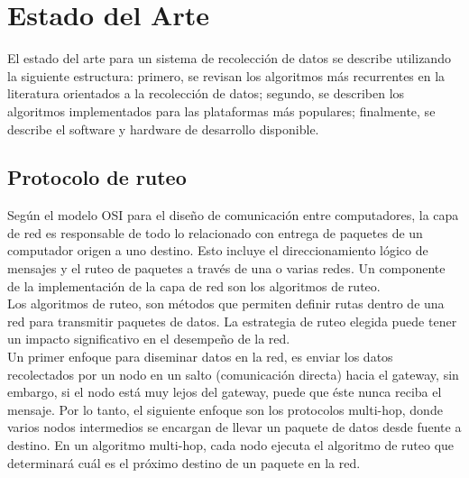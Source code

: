 \section{Estado del Arte}
El estado del arte para un sistema de recolección de datos se describe utilizando la siguiente estructura: primero, se revisan los algoritmos más recurrentes en la literatura orientados a la recolección de datos; segundo, se describen los algoritmos implementados para las plataformas más populares; finalmente, se describe el software y hardware de desarrollo disponible.

\subsection{Protocolo de ruteo}
Según el modelo OSI para el diseño de comunicación entre computadores, la capa de red es responsable de todo lo relacionado con entrega de paquetes de un computador origen a uno destino. Esto incluye el direccionamiento lógico de mensajes y el ruteo de paquetes a través de una o varias redes. Un componente de la implementación de la capa de red son los algoritmos de ruteo. \\


Los algoritmos de ruteo, son métodos que permiten definir rutas dentro de una red para transmitir paquetes de datos. La estrategia de ruteo elegida puede tener un impacto significativo en el desempeño de la red\cite{WSNSurvey}.\\


Un primer enfoque para diseminar datos en la red, es enviar los datos recolectados por un nodo en un salto (comunicación directa) hacia el gateway, sin embargo, si el nodo está muy lejos del gateway, puede que éste nunca reciba el mensaje. Por lo tanto, el siguiente enfoque son los protocolos multi-hop, donde varios nodos intermedios se encargan de llevar un paquete de datos desde fuente a destino. En un algoritmo multi-hop, cada nodo ejecuta el algoritmo de ruteo que determinará cuál es el próximo destino de un paquete en la red.

